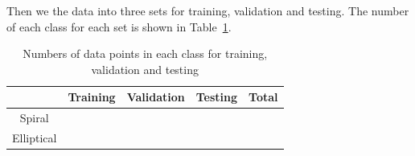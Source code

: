 Then we  the data into three sets for training, validation and testing. The number of each class for each set is shown in Table~\ref{tab:dataset}.
\begin{table}[]
	\centering
	\begin{tabular}{@{}ccccc@{}}
		\toprule
		& Training              & Validation            & Testing               & Total                 \\ \midrule
		\multicolumn{1}{|c|}{Spiral}     & \multicolumn{1}{c|}{} & \multicolumn{1}{c|}{} & \multicolumn{1}{c|}{} & \multicolumn{1}{c|}{} \\ \midrule
		\multicolumn{1}{|c|}{Elliptical} & \multicolumn{1}{c|}{} & \multicolumn{1}{c|}{} & \multicolumn{1}{c|}{} & \multicolumn{1}{c|}{} \\  \bottomrule
	\end{tabular}
\caption{Numbers of data points in each class for training, validation and testing}
\label{tab:dataset}
\end{table}
